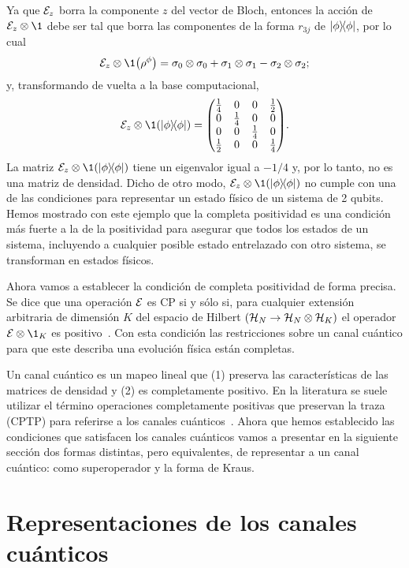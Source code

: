 Ya que $\mathcal{E}_z$ borra la componente $z$ del vector de Bloch, 
entonces la acción de $\E_z\otimes\1$ debe ser tal que borra 
las componentes de la forma $r_{3j}$ de $\dyad{\phi}{\phi}$, 
por lo cual
\begin{align}
\E_z\otimes\1 \qty({\rho}^{\phi})=
\pauli{0}{0}+\pauli{1}{1}-\pauli{2}{2};
\end{align}
y, transformando de vuelta a la base computacional,
\begin{align}
\E_z\otimes\1 \qty(\dyad{\phi}{\phi})=
\mqty( 
\frac{1}{4} & 0 & 0 & \frac{1}{2} \\
0 & \frac{1}{4} & 0 & 0 \\
0 & 0 & \frac{1}{4} & 0 \\
\frac{1}{2} & 0 & 0 & \frac{1}{4} \\
).
\end{align}
La matriz  $\E_z\otimes\1\qty(\dyad{\phi}{\phi})$ tiene un 
eigenvalor igual a $-1/4$ y, por lo tanto, no es una matriz de densidad.  
Dicho de otro modo, $\E_z\otimes\1\qty(\dyad{\phi}{\phi})$ 
no cumple con una de las condiciones para representar un estado físico
de un sistema de 2 qubits. Hemos mostrado con este ejemplo que la completa 
positividad es una condición más fuerte a la de la positividad para 
asegurar que todos los estados de un sistema, incluyendo a 
cualquier posible estado entrelazado con otro sistema, se transforman
en estados físicos.

Ahora vamos a establecer la condición de completa positividad 
de forma precisa. Se dice que una operación $\mathcal{E}$ es CP si 
y sólo si, para cualquier extensión arbitraria de dimensión $K$ 
del espacio de Hilbert $(\mathcal{H}_N \rightarrow \mathcal{H}_N \otimes \mathcal{H}_K)$ 
el operador $\E\otimes\1_K$ es positivo~\cite{bengtsson_zyczkowski_2017}. 
Con esta condición las restricciones sobre un canal cuántico 
para que este describa una evolución física están completas.

Un canal cuántico es un mapeo lineal que  (1) preserva las características
de las matrices de densidad y (2) es completamente positivo. 
En la literatura se suele utilizar el término operaciones 
completamente positivas que preservan la traza 
(CPTP) para referirse a los canales 
cuánticos~\cite{bengtsson_zyczkowski_2017}. 
Ahora que hemos establecido las condiciones que satisfacen los
canales cuánticos vamos a presentar en la siguiente sección 
dos formas distintas, pero equivalentes, de representar a un canal 
cuántico: como superoperador y la forma de Kraus.


\section{Representaciones de los canales cuánticos} %
\label{sec:qtm-channels-representation}

